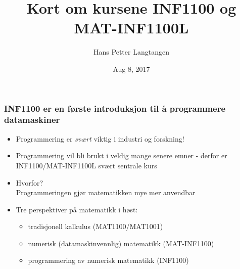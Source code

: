 \documentclass{beamer}
\begin{document}

\newcommand{\exercisesection}[1]{\subsection*{#1}}








\title{Kort om kursene INF1100 og MAT-INF1100L}


\author{Hans Petter Langtangen}

\date{Aug 8, 2017
}

\begin{frame}
\titlepage
\end{frame}

\begin{frame}
\frametitle{INF1100 er en første introduksjon til å programmere datamaskiner}

\begin{block}{}
\begin{itemize}
  \item Programmering er \emph{svært} viktig i industri og forskning!

  \item Programmering vil bli brukt i veldig mange senere emner - derfor er INF1100/MAT-INF1100L svært sentrale kurs

  \item Hvorfor?\\
    Programmeringen gjør matematikken mye mer anvendbar

  \item Tre perspektiver på matematikk i høst:
\begin{itemize}

    \item tradisjonell kalkulus (MAT1100/MAT1001)

    \item numerisk (datamaskinvennlig) matematikk (MAT-INF1100)

    \item programmering av numerisk matematikk (INF1100)
\end{itemize}

\noindent
\end{itemize}

\noindent
\end{block}
\end{frame}
\end{document}
